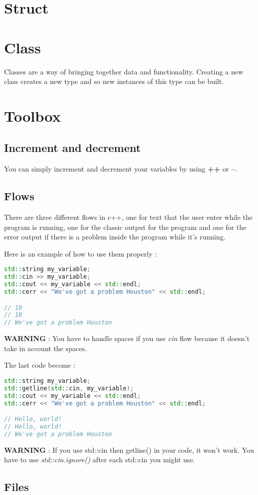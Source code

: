 \documentclass[a4paper, 12pt, titlepage]{scrartcl} %
\begin{document}
\newpage
\section{Struct}

\newpage
\section{Class}
Classes are a way of bringing together data and functionality. Creating a new class creates a new type and so new instances of this type can be built.

\newpage
\section{Toolbox}

\subsection{Increment and decrement}
You can simply increment and decrement your variables by using \textbf{++} or \textbf{--}.

\subsection{Flows}
There are three different flows in c++, one for text that the user enter while the program is running, one for the classic output for the program and one for the error output if there is a problem inside the program while it's running.

\vspace{5mm}

Here is an example of how to use them properly :
\begin{lstlisting}[language=C++]
std::string my_variable;
std::cin >> my_variable;
std::cout << my_variable << std::endl;
std::cerr << "We've got a problem Houston" << std::endl;

// 10
// 10
// We've got a problem Houston
\end{lstlisting} \vspace{5mm}

\textbf{WARNING} : You have to handle spaces if you use \textit{cin} flow because it doesn't take in account the spaces.

The last code become :
\begin{lstlisting}[language=C++]
std::string my_variable;
std::getline(std::cin, my_variable);
std::cout << my_variable << std::endl;
std::cerr << "We've got a problem Houston" << std::endl;

// Hello, world!
// Hello, world!
// We've got a problem Houston
\end{lstlisting} \vspace{5mm}

\textbf{WARNING} : If you use std::cin then getline() in your code, it won't work. You have to use \textit{std::cin.ignore()} after each std::cin you might use.


\subsection{Files}
\end{document}
